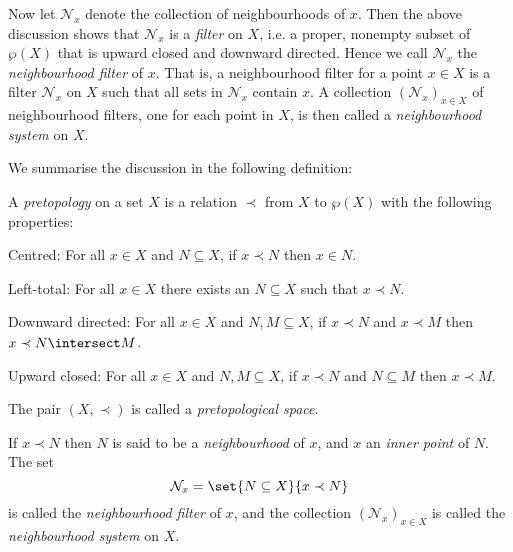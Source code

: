 \documentclass[article, a4paper, 11pt, oneside]{memoir}
\numberwithin{equation}{chapter}
\newcommand{\inpoint}{\prec}
\newcommand{\calN}{\mathcal{N}}
\newcommand{\nhoods}[1]{\calN_{#1}}
\renewcommand{\powerset}[1]{\wp(#1)}
\begin{document}
%

Now let $\nhoods{x}$ denote the collection of neighbourhoods of $x$. Then the above discussion shows that $\nhoods{x}$ is a \emph{filter} on $X$, i.e. a proper, nonempty subset of $\powerset{X}$ that is upward closed and downward directed. Hence we call $\nhoods{x}$ the \emph{neighbourhood filter} of $x$. That is, a neighbourhood filter for a point $x \in X$ is a filter $\nhoods{x}$ on $X$ such that all sets in $\nhoods{x}$ contain $x$. A collection $(\nhoods{x})_{x \in X}$ of neighbourhood filters, one for each point in $X$, is then called a \emph{neighbourhood system} on $X$.

We summarise the discussion in the following definition:

\begin{definition}
    A \emph{pretopology} on a set $X$ is a relation $\inpoint$ from $X$ to $\powerset{X}$ with the following properties:
    \begin{enumdef}
        \item Centred: For all $x \in X$ and $N \subseteq X$, if $x \inpoint N$ then $x \in N$.

        \item Left-total: For all $x \in X$ there exists an $N \subseteq X$ such that $x \inpoint N$.

        \item Downward directed: For all $x \in X$ and $N,M \subseteq X$, if $x \inpoint N$ and $x \inpoint M$ then $x \inpoint N \intersect M$.

        \item Upward closed: For all $x \in X$ and $N,M \subseteq X$, if $x \inpoint N$ and $N \subseteq M$ then $x \inpoint M$.
    \end{enumdef}
    The pair $(X,\inpoint)$ is called a \emph{pretopological space}.

    If $x \inpoint N$ then $N$ is said to be a \emph{neighbourhood} of $x$, and $x$ an \emph{inner point} of $N$. The set
    \begin{equation*}
        \nhoods{x} = \set{N \subseteq X}{x \inpoint N}
    \end{equation*}
    is called the \emph{neighbourhood filter} of $x$, and the collection $(\nhoods{x})_{x \in X}$ is called the \emph{neighbourhood system} on $X$.
\end{definition}
\end{document}
